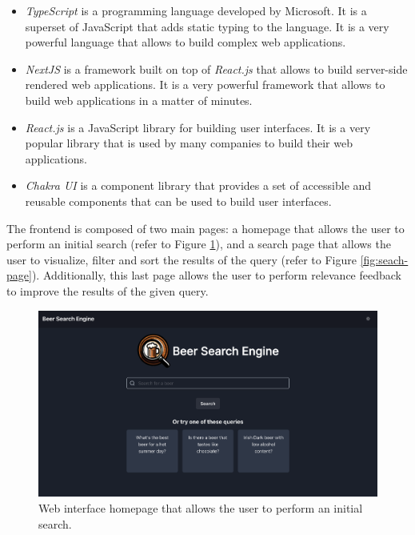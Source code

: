 \begin{itemize}
  \item \textit{TypeScript} is a programming language developed by Microsoft. It is a superset of JavaScript that adds static typing to the language. It is a very powerful language that allows to build complex web applications.

  \item \textit{NextJS} is a framework built on top of \textit{React.js} that allows to build server-side rendered web applications. It is a very powerful framework that allows to build web applications in a matter of minutes.

  \item \textit{React.js} is a JavaScript library for building user interfaces. It is a very popular library that is used by many companies to build their web applications.

  \item \textit{Chakra UI} is a component library that provides a set of accessible and reusable components that can be used to build user interfaces.
\end{itemize}

The frontend is composed of two main pages: a homepage that allows the user to perform an initial search (refer to Figure \ref{fig:home-page}), and a search page that allows the user to visualize, filter and sort the results of the query (refer to Figure \ref{fig:seach-page}). Additionally, this last page allows the user to perform relevance feedback to improve the results of the given query.

\begin{figure}[H]
  \centering
  \includegraphics[width=1\textwidth]{img/3_implementation/homepage.png}
  \caption{Web interface homepage that allows the user to perform an initial search.}
  \label{fig:home-page}
\end{figure}

